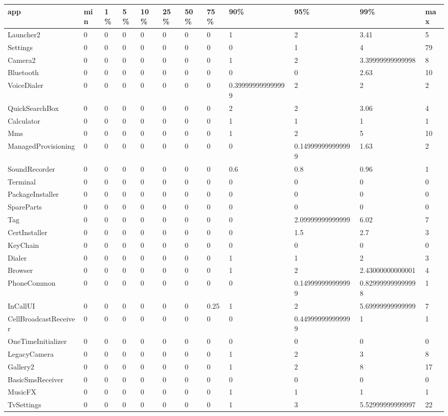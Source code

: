 \begin{tabular}{|l|l|l|l|l|l|l|l|l|l|l|l|}
\hline
app&min&1\%&5\%&10\%&25\%&50\%&75\%&90\%&95\%&99\%&max\\
\hline
Launcher2&0&0&0&0&0&0&0&1&2&3.41&5\\
\hline
Settings&0&0&0&0&0&0&0&0&1&4&79\\
\hline
Camera2&0&0&0&0&0&0&0&1&2&3.39999999999998&8\\
\hline
Bluetooth&0&0&0&0&0&0&0&0&0&2.63&10\\
\hline
VoiceDialer&0&0&0&0&0&0&0&0.399999999999999&2&2&2\\
\hline
QuickSearchBox&0&0&0&0&0&0&0&2&2&3.06&4\\
\hline
Calculator&0&0&0&0&0&0&0&1&1&1&1\\
\hline
Mms&0&0&0&0&0&0&0&1&2&5&10\\
\hline
ManagedProvisioning&0&0&0&0&0&0&0&0&0.149999999999999&1.63&2\\
\hline
SoundRecorder&0&0&0&0&0&0&0&0.6&0.8&0.96&1\\
\hline
Terminal&0&0&0&0&0&0&0&0&0&0&0\\
\hline
PackageInstaller&0&0&0&0&0&0&0&0&0&0&0\\
\hline
SpareParts&0&0&0&0&0&0&0&0&0&0&0\\
\hline
Tag&0&0&0&0&0&0&0&0&2.09999999999999&6.02&7\\
\hline
CertInstaller&0&0&0&0&0&0&0&0&1.5&2.7&3\\
\hline
KeyChain&0&0&0&0&0&0&0&0&0&0&0\\
\hline
Dialer&0&0&0&0&0&0&0&1&1&2&3\\
\hline
Browser&0&0&0&0&0&0&0&1&2&2.43000000000001&4\\
\hline
PhoneCommon&0&0&0&0&0&0&0&0&0.149999999999999&0.829999999999998&1\\
\hline
InCallUI&0&0&0&0&0&0&0.25&1&2&5.69999999999999&7\\
\hline
CellBroadcastReceiver&0&0&0&0&0&0&0&0&0.449999999999999&1&1\\
\hline
OneTimeInitializer&0&0&0&0&0&0&0&0&0&0&0\\
\hline
LegacyCamera&0&0&0&0&0&0&0&1&2&3&8\\
\hline
Gallery2&0&0&0&0&0&0&0&1&2&8&17\\
\hline
BasicSmsReceiver&0&0&0&0&0&0&0&0&0&0&0\\
\hline
MusicFX&0&0&0&0&0&0&0&1&1&1&1\\
\hline
TvSettings&0&0&0&0&0&0&0&1&3&5.52999999999997&22\\

\end{tabular}
